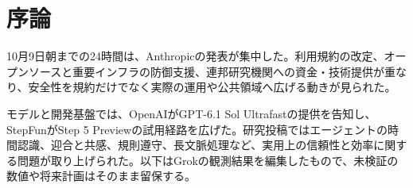 \section*{序論}
10月9日朝までの24時間は、Anthropicの発表が集中した。利用規約の改定、オープンソースと重要インフラの防御支援、連邦研究機関への資金・技術提供が重なり、安全性を規約だけでなく実際の運用や公共領域へ広げる動きが見られた。

モデルと開発基盤では、OpenAIがGPT-6.1 Sol Ultrafastの提供を告知し、StepFunがStep 5 Previewの試用経路を広げた。研究投稿ではエージェントの時間認識、迎合と共感、規則遵守、長文脈処理など、実用上の信頼性と効率に関する問題が取り上げられた。以下はGrokの観測結果を編集したもので、未検証の数値や将来計画はそのまま留保する。
